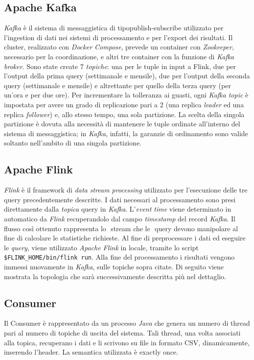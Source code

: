 \documentclass[conference]{IEEEtran}
\begin{document}
\subsection*{\textbf{Apache Kafka}}
\emph{Kafka} è il sistema di messaggistica di tipo ​publish-subscribe
utilizzato per l'ingestion di dati nei sistemi di processamento
e per l'export dei risultati. Il ​cluster, realizzato con \emph{Docker
Compose}, prevede un​ container con \emph{Zookeeper}, necessario
per la coordinazione, e altri tre​ container con la funzione di
\emph{Kafka broker}. Sono state create 7 \emph{topiche}: una per le tuple
in input a Flink, due per l'output della prima query (settimanale e
mensile), due per l'output della seconda ​query (settimanale e mensile) e altrettante per quello della terza query (per un'ora e per due ore). Per incrementare la tolleranza ai guasti, ogni \emph{Kafka ​topic} è impostata per avere un grado di replicazione pari a 2 (una replica \emph{​leader} ed una replica
\emph{follower}) e, allo stesso tempo, una sola partizione. La scelta
della singola partizione \`{e} dovuta alla necessit\`{a} di
mantenere le tuple ordinate all'interno del sistema di
messaggistica; in \emph{Kafka}, infatti, la garanzie di ordinamento
sono valide soltanto nell'ambito di una singola partizione.


\subsection*{\textbf{Apache Flink}}
\emph{Flink} \`{e} il framework di \emph{data stream processing} utilizzato per
l'esecuzione delle tre query precedentemente descritte.
I dati necessari al processamento sono presi direttamente
dalla \emph{topica} query in \emph{Kafka}. L'\emph{event time} viene determinato in automatico da \emph{Flink} recuperandolo dal campo \emph{timestamp} del record \emph{Kafka}. Il flusso cos\`{i} ottenuto rappresenta lo ​ stream che le ​ query
devono manipolare al fine di calcolare le statistiche
richieste.
Al fine di preprocessare i dati ed eseguire le \emph{query}, viene utilizzato \emph{Apache Flink} in locale, tramite lo script \texttt{\$FLINK\_HOME/bin/flink run}.
Alla fine del processamento i risultati vengono immessi nuovamente in \emph{Kafka}, sulle topiche sopra citate.
Di seguito viene mostrata la topologia che sarà
successivamente descritta più nel dettaglio.

\subsection*{\textbf{Consumer}}
Il Consumer \`{e} rappresentato da un processo \emph{Java} che genera un numero di thread pari al numero di topiche di uscita del sistema. Tali thread, una volta associati alla topica, recuperano i dati e li scrivono su file in formato CSV, dinamicamente, inserendo l'header. La semantica utilizzata \`{e} exactly once. 
\end{document}
